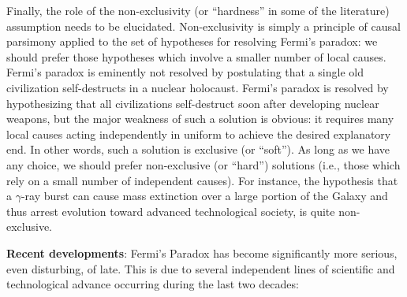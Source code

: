\documentclass[a4paper,10pt]{article}
\begin{document}
{\noindent}Finally, the role of the non-exclusivity (or ``hardness'' in some of the literature) assumption needs to be elucidated. Non-exclusivity is simply a principle of causal parsimony applied to the set of hypotheses for resolving Fermi's paradox: we should prefer those hypotheses which involve a smaller number of local causes. Fermi's paradox is eminently not resolved by postulating that a single old civilization self-destructs in a nuclear holocaust. Fermi's paradox is resolved by hypothesizing that all civilizations self-destruct soon after developing nuclear weapons, but the major weakness of such a solution is obvious: it requires many local causes acting independently in uniform to achieve the desired explanatory end. In other words, such a solution is exclusive (or ``soft''). As long as we have any choice, we should prefer non-exclusive (or ``hard'') solutions (i.e., those which rely on a small number of independent causes). For instance, the hypothesis that a $\gamma$-ray burst can cause mass extinction over a large portion of the Galaxy and thus arrest evolution toward advanced technological society, is quite non-exclusive. 

{\noindent}\textbf{Recent developments}: Fermi's Paradox has become significantly more serious, even disturbing, of late. This is due to several independent lines of scientific and technological advance occurring during the last two decades:
\end{document}
